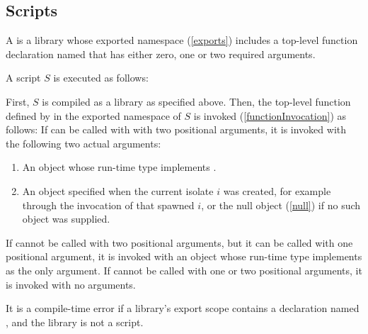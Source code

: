 \documentclass[makeidx]{article}
\begin{document}
{\subsection{Scripts}

\LMHash{}%
A  is a library whose exported namespace (\ref{exports}) includes
a top-level function declaration named 
that has either zero, one or two required arguments.

A script $S$ is executed as follows:

\LMHash{}%
First, $S$ is compiled as a library as specified above.
Then, the top-level function defined by 
in the exported namespace of $S$ is invoked (\ref{functionInvocation})
as follows:
If  can be called with with two positional arguments,
it is invoked with the following two actual arguments:
\begin{enumerate}
\item An object whose run-time type implements .
\item An object specified when the current isolate $i$ was created,
for example through the invocation of  that spawned $i$,
or the null object (\ref{null}) if no such object was supplied.
\end{enumerate}
If  cannot be called with two positional arguments,
but it can be called with one positional argument,
it is invoked with an object whose run-time type implements 
as the only argument.
If  cannot be called with one or two positional arguments,
it is invoked with no arguments.



\LMHash{}%
It is a compile-time error if a library's export scope contains a declaration
named , and the library is not a script.


}
\end{document}
